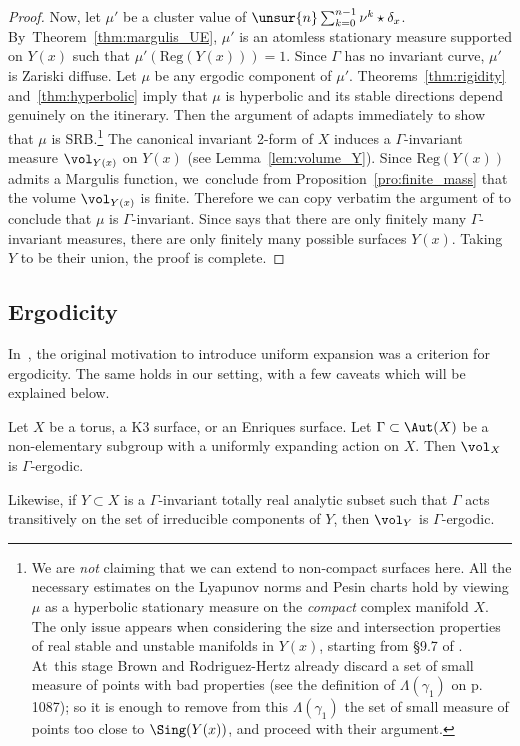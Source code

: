 \begin{proof}
Now, let $\mu'$ be a cluster value of
$\unsur{n}\sum_{k=0}^{n-1} \nu^k\star\delta_x$. By~Theorem~\ref{thm:margulis_UE}, $\mu'$
is an atomless stationary measure
supported on $Y(x)$ such that $\mu'(\mathrm{Reg}(Y(x)))=1$. Since $\Gamma$ has no invariant
curve, $\mu'$ is Zariski diffuse. Let $\mu$ be any ergodic component of $\mu'$.
Theorems~\ref{thm:rigidity} and~\ref{thm:hyperbolic} imply that $\mu$ is hyperbolic and its stable directions depend genuinely on the itinerary. Then the
argument of \cite[Th.\,3.1]{br} adapts immediately to show that $\mu$ is
SRB.\footnote{We are \emph{not} claiming that we can extend \cite{br} to non-compact surfaces here. All the necessary
estimates on the Lyapunov norms and Pesin charts
hold by viewing $\mu$ as a hyperbolic stationary measure on the
\emph{compact} complex manifold $X$. The only issue appears when considering the size and intersection
properties of real stable and unstable manifolds in $Y(x)$, starting from \S 9.7 of \cite{br}.
At~this stage Brown and Rodriguez-Hertz
already discard a set of small measure of points with bad properties (see the definition of $\Lambda(\gamma_1)$ on p. 1087); so it is enough to remove from this $\Lambda(\gamma_1)$ the set of
small measure of points too close to $\Sing(Y(x))$, and proceed with their argument.} The
canonical invariant 2-form of $X$ induces a $\Gamma$-invariant measure $\vol_{Y(x)}$
on $Y(x)$ (see Lemma~\ref{lem:volume_Y}). Since $\mathrm{Reg}(Y(x))$ admits a Margulis function, we~conclude from
Proposition~\ref{pro:finite_mass} that the volume $\vol_{Y(x)}$ is finite. Therefore we can copy verbatim the
argument of \cite[Th.\,3.4]{br} to conclude that $\mu$ is $\Gamma$-invariant.
Since \cite[Th.\,C]{invariant} says that there are only finitely many $\Gamma$-invariant measures,
there are only finitely many possible surfaces $Y(x)$. Taking $Y$ to be their union,
the proof is complete.
\end{proof}

\subsection{Ergodicity} \label{subs:ergodicity}
In~\cite{dolgopyat-krikorian}, the original motivation to introduce uniform
expansion was a criterion for ergodicity. The same holds in our setting, with a few caveats which will be explained below.

\begin{thm}
\label{thm:dolgopyat-krikorian}
Let $X$ be a torus, a K3 surface, or an Enriques surface. Let $\Gamma\subset \Aut(X)$ be a
non-elementary subgroup with a uniformly expanding action on $X$. Then $\vol_X$ is $\Gamma$-ergodic.

Likewise, if $Y\subset X$ is a $\Gamma$-invariant totally real
analytic subset such that $\Gamma$ acts transitively on the
set of irreducible components of $Y$, then $\vol_Y$ is $\Gamma$-ergodic.
\end{thm}

